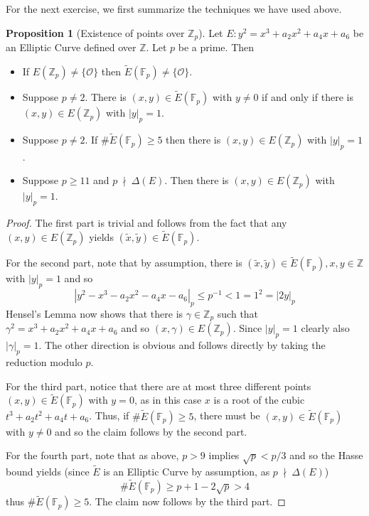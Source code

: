 \documentclass{scrartcl}
\newcommand{\Z}{\mathbb{Z}}
\newcommand{\F}{\mathbb{F}}
\renewcommand{\O}{\mathcal{O}}
\newcommand{\notdivides}{\ \nmid \ }
\theoremstyle{definition}
\newtheorem{prop}[subsection]{Proposition}
\begin{document}
For the next exercise, we first summarize the techniques we have used above.
\begin{prop}[Existence of points over $\Z_p$]
    \label{prop:p_adic_points_techniques}
    Let $E: y^2 = x^3 + a_2 x^2 + a_4 x + a_6$ be an Elliptic Curve defined over $\Z$.
    Let $p$ be a prime.
    Then
    \begin{itemize}
        \item If $E(\Z_p) \neq \{\O\}$ then $\tilde{E}(\F_p) \neq \{\O\}$.
        \item Suppose $p \neq 2$. There is $(x, y) \in \tilde{E}(\F_p)$ with $y \neq 0$ if and only if there is $(x, y) \in E(\Z_p)$ with $|y|_p = 1$.
        \item Suppose $p \neq 2$. If $\#\tilde{E}(\F_p) \geq 5$ then there is $(x, y) \in E(\Z_p)$ with $|y|_p = 1$.
        \item Suppose $p \geq 11$ and $p \notdivides \Delta(E)$. Then there is $(x, y) \in E(\Z_p)$ with $|y|_p = 1$.
    \end{itemize}
\end{prop}
\begin{proof}
    The first part is trivial and follows from the fact that any $(x, y) \in E(\Z_p)$ yields $(\tilde{x}, \tilde{y}) \in \tilde{E}(\F_p)$.

    For the second part, note that by assumption, there is $(\tilde{x}, \tilde{y}) \in \tilde{E}(\F_p), x, y \in \Z$ with $|y|_p = 1$ and so
    \begin{equation*}
        |y^2 - x^3 - a_2 x^2 - a_4 x - a_6|_p \leq p^{-1} < 1 = 1^2 = |2y|_p
    \end{equation*}
    Hensel's Lemma now \cite[Thm 2.14]{lecture} shows that there is $\gamma \in \Z_p$ such that $\gamma^2 = x^3 + a_2 x^2 + a_4 x + a_6$ and so $(x, \gamma) \in E(\Z_p)$.
    Since $|y|_p = 1$ clearly also $|\gamma|_p = 1$.
    The other direction is obvious and follows directly by taking the reduction modulo $p$.

    For the third part, notice that there are at most three different points $(x, y) \in \tilde{E}(\F_p)$ with $y = 0$, as in this case $x$ is a root of the cubic $t^3 + a_2 t^2 + a_4 t + a_6$.
    Thus, if $\#\tilde{E}(\F_p) \geq 5$, there must be $(x, y) \in \tilde{E}(\F_p)$ with $y \neq 0$ and so the claim follows by the second part.

    For the fourth part, note that as above, $p > 9$ implies $\sqrt{p} < p/3$ and so the Hasse bound \cite[Thm 1.15]{lecture} yields (since $\tilde{E}$ is an Elliptic Curve by assumption, as $p \notdivides \Delta(E)$)
    \begin{equation*}
        \#\tilde{E}(\F_p) \geq p + 1 - 2\sqrt{p} > 4
    \end{equation*}
    thus $\#\tilde{E}(\F_p) \geq 5$. 
    The claim now follows by the third part.
\end{proof}
\end{document}
